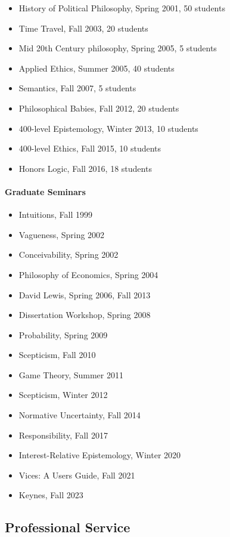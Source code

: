 \documentclass[
  10pt,
  letterpaper,
  DIV=11,
  numbers=noendperiod,
  twoside]{scrartcl}
\let\oldparagraph\paragraph
\renewcommand{\paragraph}[1]{\oldparagraph{#1}\mbox{}}
\providecommand{\tightlist}{%
  \setlength{\itemsep}{0pt}\setlength{\parskip}{0pt}}\usepackage{longtable,booktabs,array}
\begin{document}
\begin{itemize}
\tightlist
\item
  History of Political Philosophy, Spring 2001, 50 students
\item
  Time Travel, Fall 2003, 20 students
\item
  Mid 20th Century philosophy, Spring 2005, 5 students
\item
  Applied Ethics, Summer 2005, 40 students
\item
  Semantics, Fall 2007, 5 students
\item
  Philosophical Babies, Fall 2012, 20 students
\item
  400-level Epistemology, Winter 2013, 10 students
\item
  400-level Ethics, Fall 2015, 10 students
\item
  Honors Logic, Fall 2016, 18 students
\end{itemize}

\paragraph{Graduate Seminars}\label{graduate-seminars}

\begin{itemize}
\tightlist
\item
  Intuitions, Fall 1999
\item
  Vagueness, Spring 2002
\item
  Conceivability, Spring 2002
\item
  Philosophy of Economics, Spring 2004
\item
  David Lewis, Spring 2006, Fall 2013
\item
  Dissertation Workshop, Spring 2008
\item
  Probability, Spring 2009
\item
  Scepticism, Fall 2010
\item
  Game Theory, Summer 2011
\item
  Scepticism, Winter 2012
\item
  Normative Uncertainty, Fall 2014
\item
  Responsibility, Fall 2017
\item
  Interest-Relative Epistemology, Winter 2020
\item
  Vices: A Users Guide, Fall 2021
\item
  Keynes, Fall 2023
\end{itemize}

\subsection{Professional Service}\label{professional-service}
\end{document}
